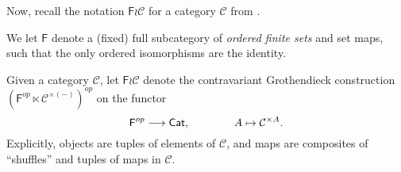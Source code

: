 \documentclass[a4paper,10pt
,draft
]{article}%
\renewcommand{\1}{\eta}%
\begin{document}







Now, recall the notation $\mathsf F \wr \mathcal C$ for a category $\mathcal C$ from \cite{BP_geo}.

\begin{notation}
      \label{F_WR_NOT}
      We let $\mathsf F$ denote a (fixed) full subcategory of \textit{ordered finite sets} and set maps,
      such that the only ordered isomorphisms are the identity.
      
      Given a category $\mathcal C$, let $\mathsf F \wr \mathcal C$ denote the contravariant Grothendieck construction
      $(\mathsf F^{op} \ltimes \mathcal C^{\times (-)})^{op}$ on the functor
      \begin{equation}
            \mathsf F^{op} \longrightarrow \mathsf{Cat},
            \qquad \qquad
            A \mapsto \mathcal C^{\times A}.
      \end{equation}
      Explicitly, objects are tuples of elements of $\mathcal C$, and maps are composites of ``shuffles'' and tuples of maps in $\mathcal C$.
\end{notation}
\end{document}
